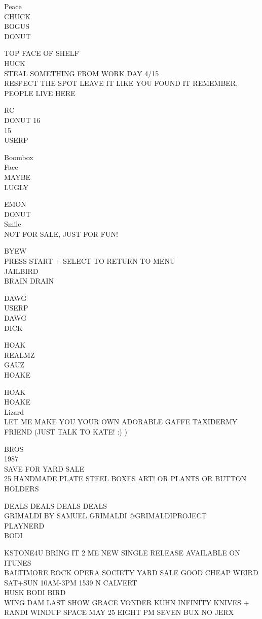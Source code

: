 \documentclass[10pt,letterpaper]{article}
\begin{document}
Peace\\
CHUCK\\
BOGUS\\
DONUT

TOP FACE OF SHELF\\
HUCK\\
STEAL SOMETHING FROM WORK DAY 4/15\\
RESPECT THE SPOT LEAVE IT LIKE YOU FOUND IT REMEMBER, PEOPLE LIVE HERE

RC\\
DONUT 16\\
15\\
USERP

Boombox\\
Face\\
MAYBE\\
LUGLY

EMON\\
DONUT\\
Smile\\
NOT FOR SALE, JUST FOR FUN!

BYEW\\
PRESS START + SELECT TO RETURN TO MENU\\
JAILBIRD\\
BRAIN DRAIN

DAWG\\
USERP\\
DAWG\\
DICK

HOAK\\
REALMZ\\
GAUZ\\
HOAKE

HOAK\\
HOAKE\\
Lizard\\
LET ME MAKE YOU YOUR OWN ADORABLE GAFFE TAXIDERMY FRIEND (JUST TALK TO KATE! :) )

BROS\\
1987\\
SAVE FOR YARD SALE\\
25 HANDMADE PLATE STEEL BOXES ART!  OR PLANTS OR BUTTON HOLDERS

DEALS DEALS DEALS DEALS\\
GRIMALDI BY SAMUEL GRIMALDI @GRIMALDIPROJECT\\
PLAYNERD\\
BODI

KSTONE4U BRING IT 2 ME NEW SINGLE RELEASE AVAILABLE ON ITUNES\\
BALTIMORE ROCK OPERA SOCIETY YARD SALE GOOD CHEAP WEIRD SAT+SUN 10AM{-}3PM 1539 N CALVERT\\
HUSK BODI BIRD\\
WING DAM LAST SHOW GRACE VONDER KUHN INFINITY KNIVES + RANDI WINDUP SPACE MAY 25 EIGHT PM SEVEN BUX NO JERX
\end{document}
